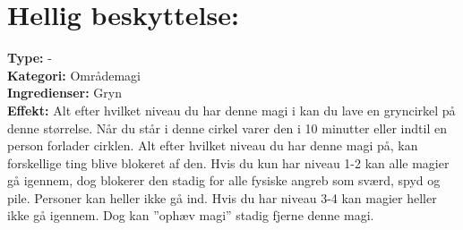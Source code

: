 \section*{Hellig beskyttelse:}
\textbf{Type:} -\\
\textbf{Kategori:} Områdemagi\\
\textbf{Ingredienser:} Gryn\\
\textbf{Effekt:} Alt efter hvilket niveau du har denne magi i kan du lave en gryncirkel på denne størrelse. Når du står i denne cirkel varer den i 10 minutter eller indtil en person forlader cirklen. Alt efter hvilket niveau du har denne magi på, kan forskellige ting blive blokeret af den. Hvis du kun har niveau 1-2 kan alle magier gå igennem, dog blokerer den stadig for alle fysiske angreb som sværd, spyd og pile. Personer kan heller ikke gå ind. Hvis du har niveau 3-4 kan magier heller ikke gå igennem. Dog kan ”ophæv magi” stadig fjerne denne magi.

